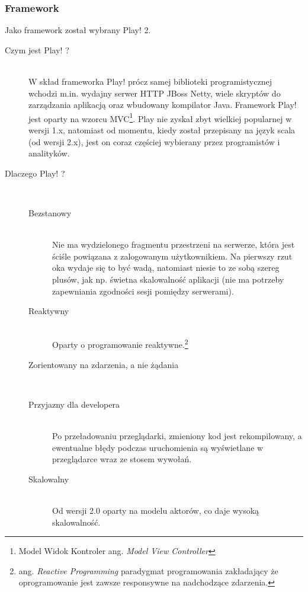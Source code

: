 \subsubsection{Framework}

Jako framework został wybrany Play! 2.

\begin{description}
	\item[Czym jest Play! ?]\hfill \\
		W skład frameworka Play! prócz samej biblioteki programistycznej wchodzi m.in. wydajny serwer HTTP JBoss Netty, wiele skryptów do zarządzania aplikacją oraz wbudowany kompilator Java. Framework Play! jest oparty na wzorcu MVC\footnote{Model Widok Kontroler ang. \emph{Model View Controller}}. Play nie zyskał zbyt wielkiej popularnej w wersji 1.x, natomiast od momentu, kiedy został przepisany na język scala (od wersji 2.x), jest on coraz częściej wybierany przez programistów i analityków. 
	\item[Dlaczego Play! ?]\hfill \\
		\begin{description}
			\item[Bezstanowy] \hfill \\ Nie ma wydzielonego fragmentu przestrzeni na serwerze, która jest ściśle powiązana z zalogowanym użytkownikiem. Na pierwszy rzut oka wydaje się to być wadą, natomiast niesie to ze sobą szereg plusów, jak np. świetna skalowalność aplikacji (nie ma potrzeby zapewniania zgodności sesji pomiędzy serwerami).
			\item[Reaktywny] \hfill \\ Oparty o programowanie reaktywne.\footnote{ang. \emph{Reactive Programming} paradygmat programowania zakładający że oprogramowanie jest zawsze responsywne na nadchodzące zdarzenia.}		
			\item[Zorientowany na zdarzenia, a nie żądania] \hfill \\  
			\item[Przyjazny dla developera] \hfill \\ Po przeładowaniu przeglądarki, zmieniony kod jest rekompilowany, a ewentualne błędy podczas uruchomienia są wyświetlane w przeglądarce wraz ze stosem wywołań.
			\item[Skalowalny] \hfill \\ Od wersji 2.0 oparty na modelu aktorów, co daje wysoką skalowalność. 
		\end{description}
\end{description}




